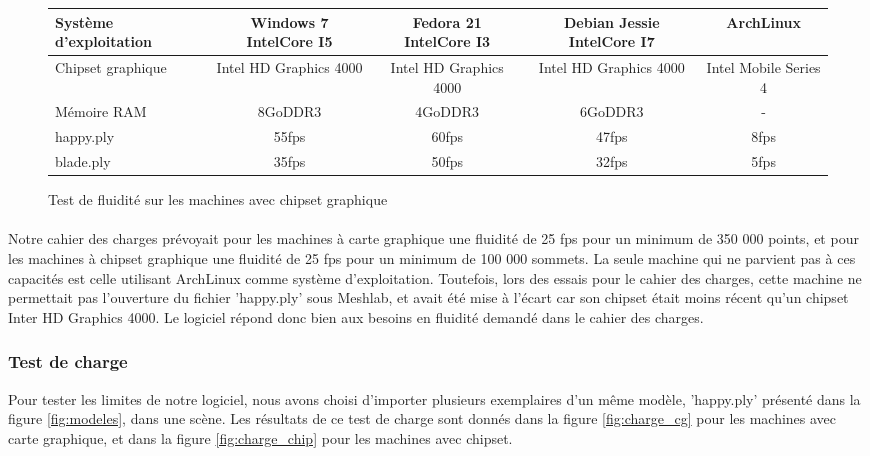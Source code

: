 \begin{figure}[h]
  \begin{changemargin}{-4cm}{-4cm}
    \centering
    \begin{tabular}{|l|c|c|c|c|}
      \hline
      Système d'exploitation & Windows 7 IntelCore I5 & Fedora 21 IntelCore I3 & Debian Jessie IntelCore I7 & ArchLinux \\ \hline
      Chipset graphique &  Intel HD Graphics 4000 & Intel HD Graphics 4000 & Intel HD Graphics 4000 & Intel Mobile Series 4 \\ \hline
      Mémoire RAM & 8GoDDR3 & 4GoDDR3  & 6GoDDR3 & -\\ \hline \hline
      happy.ply & 55fps & 60fps & 47fps & 8fps\\ \hline
      blade.ply & 35fps & 50fps & 32fps & 5fps\\ \hline
    \end{tabular}
  \end{changemargin}
  \caption{Test de fluidité sur les machines avec chipset graphique}
  \label{tab:fps_chip}
\end{figure}

\paragraph{}
Notre cahier des charges prévoyait pour les machines à carte graphique une fluidité de 25 fps pour un minimum de 350 000 points, et pour les machines à chipset graphique une fluidité de 25 fps pour un minimum de 100 000 sommets. La seule machine qui ne parvient pas à ces capacités est celle utilisant ArchLinux comme système d'exploitation. Toutefois, lors des essais pour le cahier des charges, cette machine ne permettait pas l'ouverture du fichier 'happy.ply' sous Meshlab, et avait été mise à l'écart car son chipset était moins récent qu'un chipset Inter HD Graphics 4000. Le logiciel répond donc bien aux besoins en fluidité demandé dans le cahier des charges.

\subsubsection{Test de charge}
Pour tester les limites de notre logiciel, nous avons choisi d'importer plusieurs exemplaires d'un même modèle, 'happy.ply' présenté dans la figure \ref{fig:modeles}, dans une scène. Les résultats de ce test de charge sont donnés dans la figure \ref{fig:charge_cg} pour les machines avec carte graphique, et dans la figure \ref{fig:charge_chip} pour les machines avec chipset.

